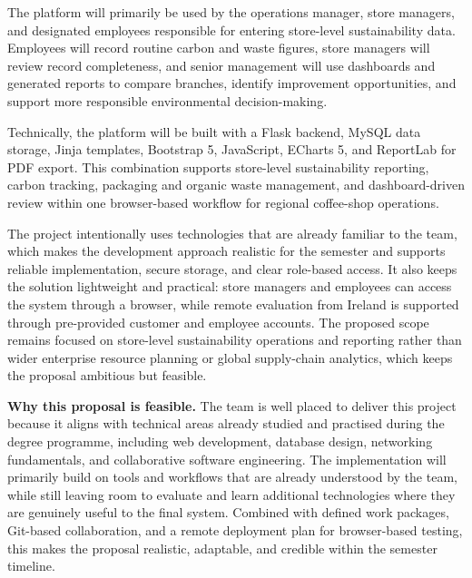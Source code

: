 \documentclass[10pt,a4paper]{article}
\begin{document}
The platform will primarily be used by the operations manager, store managers, and designated employees responsible for entering store-level sustainability data. Employees will record routine carbon and waste figures, store managers will review record completeness, and senior management will use dashboards and generated reports to compare branches, identify improvement opportunities, and support more responsible environmental decision-making.

Technically, the platform will be built with a Flask backend, MySQL data storage, Jinja templates, Bootstrap 5, JavaScript, ECharts 5, and ReportLab for PDF export. This combination supports store-level sustainability reporting, carbon tracking, packaging and organic waste management, and dashboard-driven review within one browser-based workflow for regional coffee-shop operations.

The project intentionally uses technologies that are already familiar to the team, which makes the development approach realistic for the semester and supports reliable implementation, secure storage, and clear role-based access. It also keeps the solution lightweight and practical: store managers and employees can access the system through a browser, while remote evaluation from Ireland is supported through pre-provided customer and employee accounts. The proposed scope remains focused on store-level sustainability operations and reporting rather than wider enterprise resource planning or global supply-chain analytics, which keeps the proposal ambitious but feasible.

\textbf{Why this proposal is feasible.} The team is well placed to deliver this project because it aligns with technical areas already studied and practised during the degree programme, including web development, database design, networking fundamentals, and collaborative software engineering. The implementation will primarily build on tools and workflows that are already understood by the team, while still leaving room to evaluate and learn additional technologies where they are genuinely useful to the final system. Combined with defined work packages, Git-based collaboration, and a remote deployment plan for browser-based testing, this makes the proposal realistic, adaptable, and credible within the semester timeline.
\end{document}
